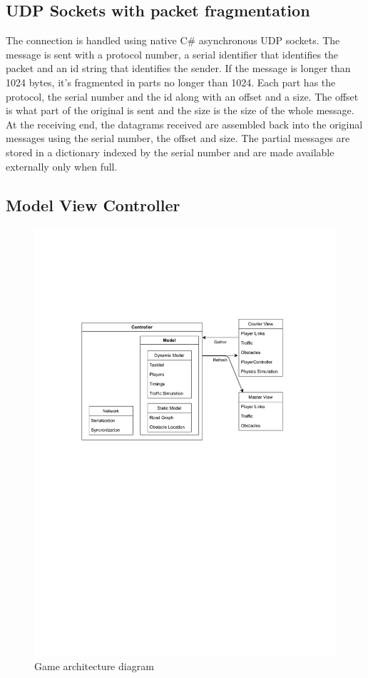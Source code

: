 \documentclass{article}
\begin{document}
\subsection{UDP Sockets with packet fragmentation}
The connection is handled using native C\# asynchronous UDP sockets. The message is sent with a protocol number, a serial identifier that identifies the packet and an id string that identifies the sender. If the message is longer than 1024 bytes, it's fragmented in parts no longer than 1024. Each part has the protocol, the serial number and the id along with an offset and a size. The offset is what part of the original is sent and the size is the size of the whole message. At the receiving end, the datagrams received are assembled back into the original messages using the serial number, the offset and size. The partial messages are stored in a dictionary indexed by the serial number and are made available externally only when full. 
\subsection{Model View Controller}
\begin{figure}[H]
\includegraphics[width=\textwidth]{game architecture}
\caption{Game architecture diagram}
\label{fig:gamearch}
\end{figure}
\end{document}
